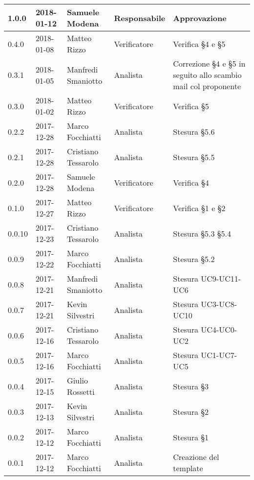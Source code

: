 \documentclass[./AnalisideiRequisiti.tex]{subfiles}
\begin{document}
{\begin{longtable}{|p{20mm}|p{20mm}|p{40mm}|p{30mm}|p{50mm}|}
		1.0.0 & 2018-01-12 & Samuele Modena & Responsabile & Approvazione\\ \hline
		0.4.0 & 2018-01-08 & Matteo Rizzo & Verificatore & Verifica §4 e §5\\ \hline
		0.3.1 & 2018-01-05 & Manfredi Smaniotto & Analista & Correzione §4 e §5 in seguito allo scambio mail col proponente \\ \hline		
		0.3.0 & 2018-01-02 & Matteo Rizzo & Verificatore & Verifica §5\\ \hline
		0.2.2 & 2017-12-28 & Marco Focchiatti & Analista & Stesura §5.6\\ \hline	
		0.2.1 & 2017-12-28 & Cristiano Tessarolo & Analista & Stesura §5.5\\ \hline
	   	0.2.0 & 2017-12-28 & Samuele Modena & Verificatore & Verifica §4\\ \hline
	   	0.1.0 & 2017-12-27 & Matteo Rizzo & Verificatore & Verifica §1 e §2  \\ \hline		
		0.0.10 & 2017-12-23 & Cristiano Tessarolo & Analista & Stesura §5.3 §5.4\\ \hline		
		0.0.9 & 2017-12-22 & Marco Focchiatti & Analista & Stesura §5.2 \\ \hline		
		0.0.8 & 2017-12-21 & Manfredi Smaniotto & Analista & Stesura UC9-UC11-UC6\\ \hline
		0.0.7 & 2017-12-21 & Kevin Silvestri & Analista & Stesura UC3-UC8-UC10\\ \hline
		0.0.6 & 2017-12-16 & Cristiano Tessarolo & Analista & Stesura UC4-UC0-UC2\\ \hline
		0.0.5 & 2017-12-16 & Marco Focchiatti & Analista & Stesura UC1-UC7-UC5\\ \hline
		0.0.4 & 2017-12-15 & Giulio Rossetti & Analista & Stesura §3\\ \hline
		0.0.3 & 2017-12-13 & Kevin Silvestri & Analista & Stesura §2\\ \hline
		0.0.2 & 2017-12-12 & Marco Focchiatti & Analista & Stesura §1\\ \hline
		0.0.1 & 2017-12-12 & Marco Focchiatti & Analista & Creazione del template\\ \hline
	\end{longtable}

}	
\end{document}
